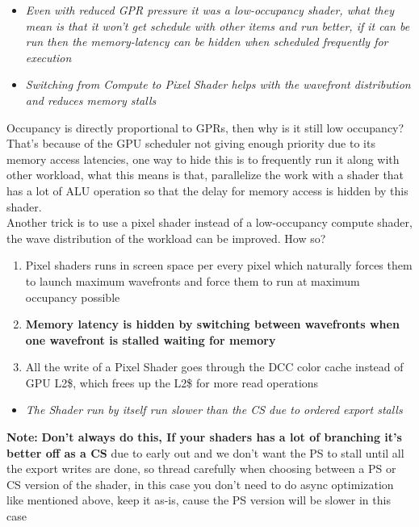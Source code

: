 \documentclass[14pt]{article}
\begin{document}

\begin{itemize}
	\item \textit{Even with reduced GPR pressure it was a low-occupancy shader, what they mean is that it won't get schedule with other items and run better, if it can be run then the memory-latency can be hidden when scheduled frequently for execution}

	\item \textit{Switching from Compute to Pixel Shader helps with the wavefront distribution and reduces memory stalls}
\end{itemize}

Occupancy is directly proportional to GPRs, then why is it still low occupancy? That's because of the GPU scheduler not giving enough priority due to its memory access latencies, one way to hide this is to frequently run it along with other workload, what this means is that, parallelize the work with a shader that has a lot of ALU operation so that the delay for memory access is hidden by this shader.\\

Another trick is to use a pixel shader instead of a low-occupancy compute shader, the wave distribution of the workload can be improved. How so? \\

\begin{enumerate}

	\item Pixel shaders runs in screen space per every pixel which naturally forces them to launch maximum wavefronts and force them to run at maximum occupancy possible
	\item \textbf{Memory latency is hidden by switching between wavefronts when one wavefront is stalled waiting for memory}	
	\item All the write of a Pixel Shader goes through the DCC color cache instead of GPU L2\$, which frees up the L2\$ for more read operations
	
\end{enumerate}

\begin{itemize}
	\item \textit{The Shader run by itself run slower than the CS due to ordered export stalls}
\end{itemize}
	
	\textbf{Note:} \textbf{Don't always do this, If your shaders has a lot of branching it's better off as a CS} due to early out and we don't want the PS to stall until all the export writes are done, so thread carefully when choosing between a PS or CS version of the shader, in this case you don't need to do async optimization like mentioned above, keep it as-is, cause the PS version will be slower in this case
		
\end{document}
